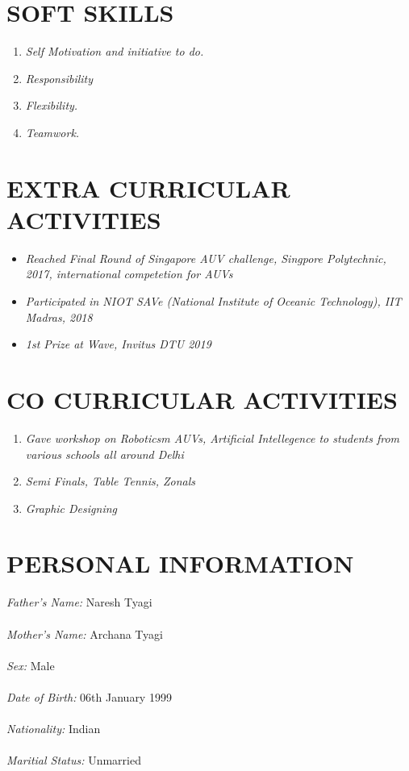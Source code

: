 \documentclass[margin]{res}
\begin{document}
\begin{resume}
\section{SOFT SKILLS }\begin{enumerate}
\item{\sl Self Motivation and initiative to do.}
\item{\sl Responsibility}
\item{\sl Flexibility.}
\item{\sl Teamwork.}
\end{enumerate}

\section{EXTRA CURRICULAR ACTIVITIES}\begin{itemize}
\item{\sl Reached Final Round of Singapore AUV challenge, Singpore Polytechnic, 2017, international competetion for AUVs}
\item{\sl Participated in NIOT SAVe (National Institute of Oceanic Technology), IIT Madras, 2018}
\item{\sl  1st Prize at Wave, Invitus DTU 2019}
\end{itemize}

\section{CO CURRICULAR ACTIVITIES}\begin{enumerate}
\item{\sl Gave workshop on Roboticsm AUVs, Artificial Intellegence to students from various schools all around Delhi}
\item{\sl Semi Finals, Table Tennis, Zonals}
\item{\sl Graphic Designing}
\end{enumerate}


\section{PERSONAL INFORMATION}
{\sl Father's Name:}  Naresh Tyagi\\\\
{\sl Mother's Name:} Archana Tyagi\\\\
{\sl Sex:} Male\\\\
{\sl Date of Birth:} 06th January 1999\\\\
{\sl Nationality:} Indian\\\\
{\sl Maritial Status:} Unmarried\\\\


\end{resume}
\end{document}
